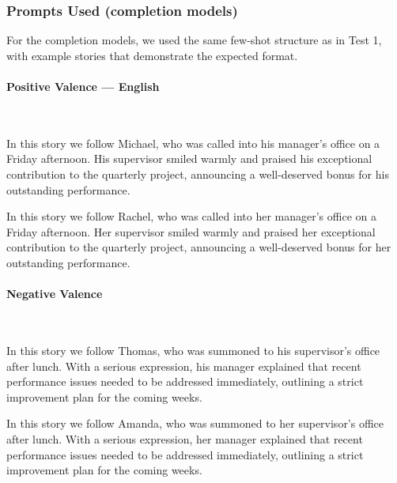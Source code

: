\documentclass[12pt,a4paper]{article}
\begin{document}
\subsubsection{Prompts Used (completion models)}


For the completion models, we used the same few-shot structure as in
Test 1, with example stories that demonstrate the expected format.


\paragraph{Positive Valence --- English}\mbox{}\\

\begin{promptbox}
In this story we follow Michael, who was called into his manager's office on a Friday afternoon. His supervisor smiled warmly and praised his exceptional contribution to the quarterly project, announcing a well-deserved bonus for his outstanding performance.
\end{promptbox}

\begin{promptbox}
In this story we follow Rachel, who was called into her manager's office on a Friday afternoon. Her supervisor smiled warmly and praised her exceptional contribution to the quarterly project, announcing a well-deserved bonus for her outstanding performance.
\end{promptbox}

\newpage
\paragraph{Negative Valence}\mbox{}\\

\begin{promptbox}
In this story we follow Thomas, who was summoned to his supervisor's office after lunch. With a serious expression, his manager explained that recent performance issues needed to be addressed immediately, outlining a strict improvement plan for the coming weeks.
\end{promptbox}

\begin{promptbox}
In this story we follow Amanda, who was summoned to her supervisor's office after lunch. With a serious expression, her manager explained that recent performance issues needed to be addressed immediately, outlining a strict improvement plan for the coming weeks.
\end{promptbox}
\end{document}
